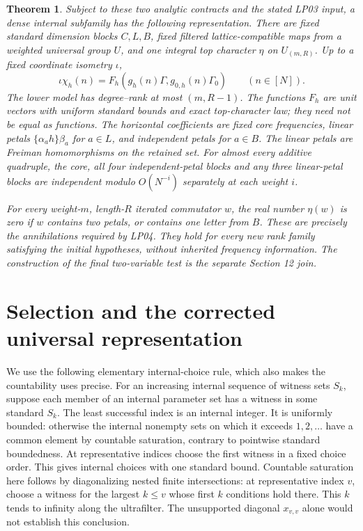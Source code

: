 \documentclass[11pt]{article}
\newtheorem{theorem}{Theorem}\newtheorem{lemma}[theorem]{Lemma}
\begin{document}
\begin{theorem}\label{thm:output}
Subject to these two analytic contracts and the stated LP03 input, a dense
internal subfamily has the following representation. There are fixed standard
dimension blocks $C,L,B$, fixed filtered lattice-compatible maps from a
weighted universal group $U$, and one integral top character $\eta$ on
$U_{(m,R)}$. Up to a fixed coordinate isometry $\iota$,
\[
 \iota\chi_h(n)=F_h(g_h(n)\Gamma,g_{0,h}(n)\Gamma_0)
 \qquad(n\in[N]).
\]
The lower model has degree--rank at most $(m,R-1)$. The functions $F_h$ are
unit vectors with uniform standard bounds and exact top-character law;
they need not be equal as functions. The horizontal coefficients are fixed
core frequencies, linear petals $\{\alpha_a h\}\beta_a$ for $a\in L$, and
independent petals for $a\in B$. The linear petals are Freiman homomorphisms
on the retained set. For almost every additive quadruple, the core, all four
independent-petal blocks and any three linear-petal blocks are independent
modulo $O(N^{-i})$ separately at each weight $i$.

For every weight-$m$, length-$R$ iterated commutator $w$, the real number
$\eta(w)$ is zero if $w$ contains two petals, or contains one letter from
$B$. These are precisely the annihilations required by LP04. They hold for
every new rank family satisfying the initial hypotheses, without inherited
frequency information. The construction of the final two-variable test is
the separate Section 12 join.
\end{theorem}

\section{Selection and the corrected universal representation}
We use the following elementary internal-choice rule, which also makes the
countability uses precise. For an increasing internal sequence of witness
sets $S_k$, suppose each member of an internal parameter set has a witness
in some standard $S_k$. The least successful index is an internal integer.
It is uniformly bounded: otherwise the internal nonempty sets on which it
exceeds $1,2,\ldots$ have a common element by countable saturation, contrary
to pointwise standard boundedness. At representative indices choose the
first witness in a fixed choice order. This gives internal choices with one
standard bound. Countable saturation here follows by diagonalizing nested
finite intersections: at representative index $v$, choose a witness for the
largest $k\leq v$ whose first $k$ conditions hold there. This $k$ tends to
infinity along the ultrafilter. The unsupported diagonal $x_{v,v}$ alone
would not establish this conclusion.
\end{document}
